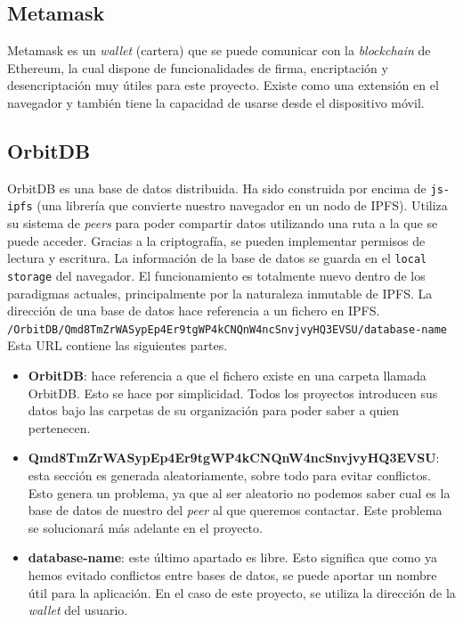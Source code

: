 \subsection{Metamask}
Metamask es un \textit{wallet} (cartera) que se puede comunicar con la \textit{blockchain} de Ethereum, la cual dispone de funcionalidades de firma, encriptación y desencriptación muy útiles para este proyecto. Existe como una extensión en el navegador y también tiene la capacidad de usarse desde el dispositivo móvil.
\subsection{OrbitDB}
OrbitDB es una base de datos distribuida. Ha sido construida por encima de \verb|js-ipfs| (una librería que convierte nuestro navegador en un nodo de IPFS). Utiliza su sistema de \textit{peers} para poder compartir datos utilizando una ruta a la que se puede acceder. Gracias a la criptografía, se pueden implementar permisos de lectura y escritura. La información de la base de datos se guarda en el \verb|local storage| del navegador. El funcionamiento es totalmente nuevo dentro de los paradigmas actuales, principalmente por la naturaleza inmutable de IPFS. La dirección de una base de datos hace referencia a un fichero en IPFS.\\
\verb|/OrbitDB/Qmd8TmZrWASypEp4Er9tgWP4kCNQnW4ncSnvjvyHQ3EVSU/database-name|\\
Esta URL contiene las siguientes partes.
\begin{itemize}
    \item \textbf{OrbitDB}: hace referencia a que el fichero existe en una carpeta llamada OrbitDB. Esto se hace por simplicidad. Todos los proyectos introducen sus datos bajo las carpetas de su organización para poder saber a quien pertenecen.
    \item \textbf{Qmd8TmZrWASypEp4Er9tgWP4kCNQnW4ncSnvjvyHQ3EVSU}: esta sección es generada aleatoriamente, sobre todo para evitar conflictos. Esto genera un problema, ya que al ser aleatorio no podemos saber cual es la base de datos de nuestro del \textit{peer} al que queremos contactar. Este problema se solucionará más adelante en el proyecto.
    \item \textbf{database-name}: este último apartado es libre. Esto significa que como ya hemos evitado conflictos entre bases de datos, se puede aportar un nombre útil para la aplicación. En el caso de este proyecto, se utiliza la dirección de la \textit{wallet} del usuario.
\end{itemize}
